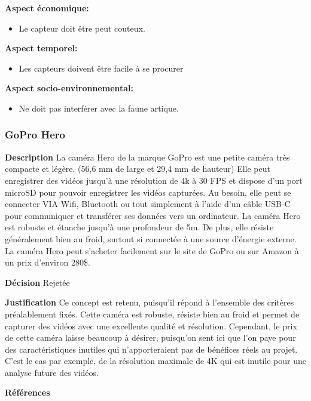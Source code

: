 \noindent\textbf{Aspect économique:}
\begin{itemize}
    \item Le capteur doit être peut couteux.
\end{itemize}

\noindent\textbf{Aspect temporel:}
\begin{itemize}
    \item Les capteurs doivent être facile à se procurer
\end{itemize}

\noindent\textbf{Aspect socio-environnemental:}
\begin{itemize}
    \item Ne doit pas interférer avec la faune artique.
\end{itemize}


\subsubsection{GoPro Hero}
\noindent\textbf{Description} La caméra Hero de la marque GoPro est une petite caméra très compacte et légère. (56,6 mm de large et 29,4 mm de hauteur) Elle peut enregistrer des vidéos jusqu'à une résolution de 4k à 30 FPS et dispose d'un port microSD pour pouvoir enregistrer les vidéos capturées. Au besoin, elle peut se connecter VIA Wifi, Bluetooth ou tout simplement à l'aide d'un câble USB-C pour communiquer et transférer ses données vers un ordinateur. La caméra Hero est robuste et étanche jusqu'à une profondeur de 5m. De plus, elle résiste généralement bien au froid, surtout si connectée à une source d'énergie externe. La caméra Hero peut s'acheter facilement sur le site de GoPro ou sur Amazon à un prix d'environ 280\$.

\noindent\textbf{Décision} Rejetée

\noindent\textbf{Justification} Ce concept est retenu, puisqu'il répond à l'ensemble des critères préalablement fixés. Cette caméra est robuste, résiste bien au froid et permet de capturer des vidéos avec une excellente qualité et résolution. Cependant, le prix de cette caméra laisse beaucoup à désirer, puisqu'on sent ici que l'on paye pour des caractéristiques inutiles qui n'apporteraient pas de bénéfices réels au projet. C'est le cas par exemple, de la résolution maximale de 4K qui est inutile pour une analyse future des vidéos.

\noindent\textbf{Références}
\cite{Gopro1}
\cite{Gopro2}

